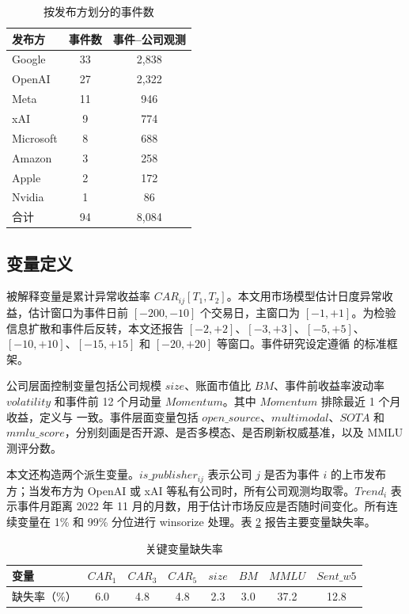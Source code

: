 \documentclass[11pt,fontset=fandol]{ctexart}
\begin{document}
\begin{table}[htbp]
\centering
\caption{按发布方划分的事件数}
\label{tab:publisher_dist}
\small
\begin{tabular}{lcc}
\toprule
发布方 & 事件数 & 事件--公司观测 \\
\midrule
Google      & 33 & 2{,}838 \\
OpenAI      & 27 & 2{,}322 \\
Meta        & 11 &   946 \\
xAI         &  9 &   774 \\
Microsoft   &  8 &   688 \\
Amazon      &  3 &   258 \\
Apple       &  2 &   172 \\
Nvidia      &  1 &    86 \\
\midrule
合计        & 94 & 8{,}084 \\
\bottomrule
\end{tabular}
\end{table}

\subsection{变量定义}

被解释变量是累计异常收益率 $CAR_{ij}[T_1,T_2]$。本文用市场模型估计日度异常收益，估计窗口为事件日前 $[-200,-10]$ 个交易日，主窗口为 $[-1,+1]$。为检验信息扩散和事件后反转，本文还报告 $[-2,+2]$、$[-3,+3]$、$[-5,+5]$、$[-10,+10]$、$[-15,+15]$ 和 $[-20,+20]$ 等窗口。事件研究设定遵循 \citet{MacKinlay1997} 的标准框架。

公司层面控制变量包括公司规模 $size$、账面市值比 $BM$、事件前收益率波动率 $volatility$ 和事件前 12 个月动量 $Momentum$。其中 $Momentum$ 排除最近 1 个月收益，定义与 \citet{Carhart1997} 一致。事件层面变量包括 $open\_source$、$multimodal$、$SOTA$ 和 $mmlu\_score$，分别刻画是否开源、是否多模态、是否刷新权威基准，以及 MMLU 测评分数。

本文还构造两个派生变量。$is\_publisher_{ij}$ 表示公司 $j$ 是否为事件 $i$ 的上市发布方；当发布方为 OpenAI 或 xAI 等私有公司时，所有公司观测均取零。$Trend_i$ 表示事件月距离 2022 年 11 月的月数，用于估计市场反应是否随时间变化。所有连续变量在 1\% 和 99\% 分位进行 winsorize 处理。表 \ref{tab:missing} 报告主要变量缺失率。

\begin{table}[htbp]
\centering
\caption{关键变量缺失率}
\label{tab:missing}
\small
\begin{tabular}{lccccccc}
\toprule
变量 & $CAR_{1}$ & $CAR_{3}$ & $CAR_{5}$ & $size$ & $BM$ & $MMLU$ & $Sent\_w5$ \\
\midrule
缺失率（\%） & 6.0 & 4.8 & 4.8 & 2.3 & 3.0 & 37.2 & 12.8 \\
\bottomrule
\end{tabular}
\end{table}
\end{document}
